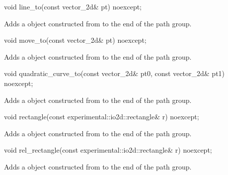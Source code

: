 \begin{itemdecl}
void line_to(const vector_2d& pt) noexcept;
\end{itemdecl}
\begin{itemdescr}
\pnum
Adds a  object constructed from  to the end of the path group.
\end{itemdescr}

\begin{itemdecl}
void move_to(const vector_2d& pt) noexcept;
\end{itemdecl}
\begin{itemdescr}
\pnum
\effects
Adds a  object constructed from  to the end of the path group.
\end{itemdescr}

\begin{itemdecl}
void quadratic_curve_to(const vector_2d& pt0, const vector_2d& pt1) noexcept;
\end{itemdecl}
\begin{itemdescr}
\pnum
\effects
\pnum
Adds a  object constructed from  to the end of the path group.
\end{itemdescr}

\begin{itemdecl}
void rectangle(const experimental::io2d::rectangle& r) noexcept;
\end{itemdecl}
\begin{itemdescr}
\pnum
\effects
Adds a  object constructed from  to the end of the path group.
\end{itemdescr}

\begin{itemdecl}
void rel_rectangle(const experimental::io2d::rectangle& r) noexcept;
\end{itemdecl}
\begin{itemdescr}
\pnum
\effects
Adds a  object constructed from  to the end of the path group.
\end{itemdescr}

